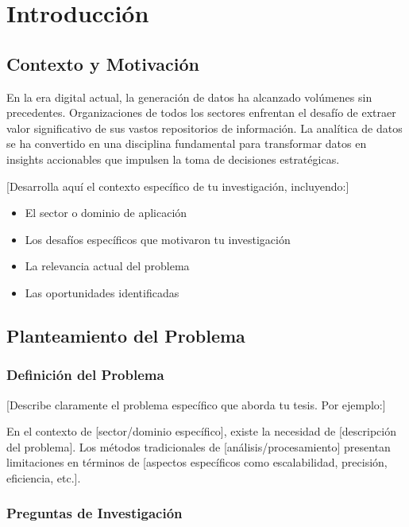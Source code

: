 
\chapter{Introducción}

\section{Contexto y Motivación}

En la era digital actual, la generación de datos ha alcanzado volúmenes sin precedentes. Organizaciones de todos los sectores enfrentan el desafío de extraer valor significativo de sus vastos repositorios de información. La analítica de datos se ha convertido en una disciplina fundamental para transformar datos en insights accionables que impulsen la toma de decisiones estratégicas.

[Desarrolla aquí el contexto específico de tu investigación, incluyendo:]
\begin{itemize}
    \item El sector o dominio de aplicación
    \item Los desafíos específicos que motivaron tu investigación
    \item La relevancia actual del problema
    \item Las oportunidades identificadas
\end{itemize}

\section{Planteamiento del Problema}

\subsection{Definición del Problema}

[Describe claramente el problema específico que aborda tu tesis. Por ejemplo:]

En el contexto de [sector/dominio específico], existe la necesidad de [descripción del problema]. Los métodos tradicionales de [análisis/procesamiento] presentan limitaciones en términos de [aspectos específicos como escalabilidad, precisión, eficiencia, etc.].

\subsection{Preguntas de Investigación}

